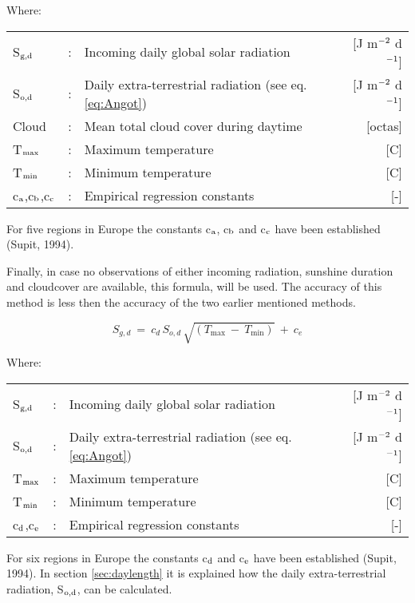 Where:\\[5pt]
\begin{tabularx}{\textwidth}{llXr}
	S$_{{\rm g,d}}$ &:& Incoming daily global solar radiation  & [J m$^{{\rm -2}}$ d$^{{\rm -1}}$]\\
	S$_{{\rm o,d}}$ &:& Daily extra-terrestrial radiation (see eq. \ref{eq:Angot})  & 
	[J m$^{{\rm -2}}$ d$^{{\rm -1}}$]\\
	Cloud &:& Mean total cloud cover during daytime  & [octas]\\
	T$_{{\rm max}}$ &:& Maximum temperature  & [\textdegree C]\\
	T$_{{\rm min}}$ &:& Minimum temperature  & [\textdegree C]\\
	c$_{{\rm a}}$,c$_{{\rm b}}$,c$_{{\rm c}}$ &:& Empirical regression constants   & [-]
\end{tabularx}

For five regions in Europe the constants c$_{{\rm a}}$, c$_{{\rm b}}$ and c$_{{\rm c}}$ 
have been established (Supit, 1994).

Finally, in case no observations of either incoming radiation, sunshine duration and
cloudcover are available, this formula, will be used. The accuracy of this method is less
then the accuracy of the two earlier mentioned methods.

\begin{equation}
S _{g,d} ~=~ c _{d} \, S _{o,d} \, \sqrt{(T _{\max} ~-~T _{\min} )} ~+~c _{e} 
\end{equation}

Where:\\[5pt]
\begin{tabularx}{\textwidth}{llXr}
	S$_{{\rm g,d}}$ &:& Incoming daily global solar radiation  & [J m$^{{\rm -2}}$ d$^{{\rm -1}}$]\\
	S$_{{\rm o,d}}$ &:& Daily extra-terrestrial radiation (see eq. \ref{eq:Angot})  & 
	[J m$^{{\rm -2}}$ d$^{{\rm -1}}$]\\
	T$_{{\rm max}}$ &:& Maximum temperature  & [\textdegree C]\\
	T$_{{\rm min}}$ &:& Minimum temperature  & [\textdegree C]\\
	c$_{{\rm d}}$,c$_{{\rm e}}$  &:& Empirical regression constants  & [-]\\
\end{tabularx}

For six regions in Europe the constants c$_{{\rm d}}$ and c$_{{\rm e}}$ have been 
established (Supit, 1994). In section \ref{sec:daylength} it is explained how the 
daily extra-terrestrial radiation, S$_{{\rm o,d}}$, can be calculated.

